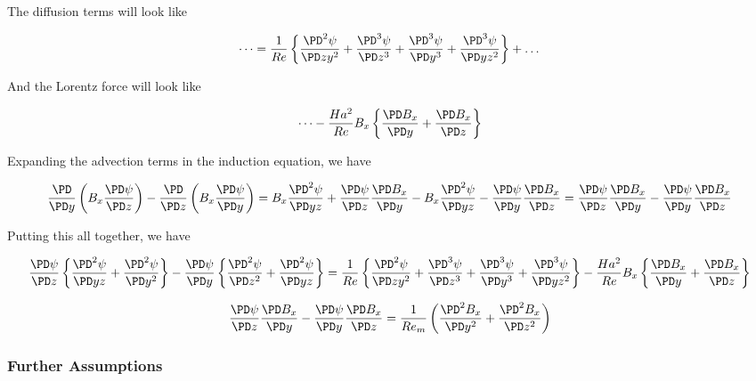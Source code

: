 \documentclass[11pt]{article}
\begin{document}
The diffusion terms will look like

\begin{equation}
	\dots
	=
	\frac{1}{Re}
	\left\{
	\frac{\PD^2 \psi}{\PD z y^2}
	+
	\frac{\PD^3 \psi}{\PD z^3}
	+
	\frac{\PD^3 \psi}{\PD y^3}
	+\frac{\PD^3 \psi}{\PD y z^2}
	\right\}
	+ \dots
\end{equation}

And the Lorentz force will look like

\begin{equation}
	\dots
	-
	\frac{Ha^2}{Re}
	B_x
	\left\{
	\frac{\PD B_x}{\PD y}
	+
	\frac{\PD B_x}{\PD z}
	\right\}
\end{equation}

Expanding the advection terms in the induction equation, we have

\begin{equation}
	\frac{\PD}{\PD y} \left( B_x \frac{\PD \psi}{\PD z} \right)
	- \frac{\PD}{\PD z} \left( B_x \frac{\PD \psi}{\PD y} \right)
	=
	B_x \frac{\PD^2 \psi}{\PD yz}
	+
	\frac{\PD \psi}{\PD z}
	\frac{\PD B_x}{\PD y}
	-
	B_x
	\frac{\PD^2 \psi}{\PD y z}
	-
	\frac{\PD \psi}{\PD y}
	\frac{\PD B_x}{\PD z}
	=
	\frac{\PD \psi}{\PD z}
	\frac{\PD B_x}{\PD y}
	-
	\frac{\PD \psi}{\PD y}
	\frac{\PD B_x}{\PD z}
\end{equation}

Putting this all together, we have

\begin{equation}
	\frac{\PD \psi }{\PD z}
	\left\{
	\frac{\PD^2 \psi}{\PD yz}
	+
	\frac{\PD^2 \psi}{\PD y^2}
	\right\}
	-
	\frac{\PD \psi}{\PD y}
	\left\{
	\frac{\PD^2 \psi}{\PD z^2}
	+
	\frac{\PD^2 \psi}{\PD yz}
	\right\}
	=
	\frac{1}{Re}
	\left\{
	\frac{\PD^2 \psi}{\PD z y^2}
	+
	\frac{\PD^3 \psi}{\PD z^3}
	+
	\frac{\PD^3 \psi}{\PD y^3}
	+\frac{\PD^3 \psi}{\PD y z^2}
	\right\}
	-
	\frac{Ha^2}{Re}
	B_x
	\left\{
	\frac{\PD B_x}{\PD y}
	+
	\frac{\PD B_x}{\PD z}
	\right\}
\end{equation}

\begin{equation}
	\frac{\PD \psi}{\PD z}
	\frac{\PD B_x}{\PD y}
	-
	\frac{\PD \psi}{\PD y}
	\frac{\PD B_x}{\PD z}
	=
	\frac{1}{Re_m}
	\left(
	\frac{\PD^2 B_x}{\PD y^2}
	+ \frac{\PD^2 B_x}{\PD z^2}
	\right)
\end{equation}


\subsubsection{Further Assumptions}
\end{document}
